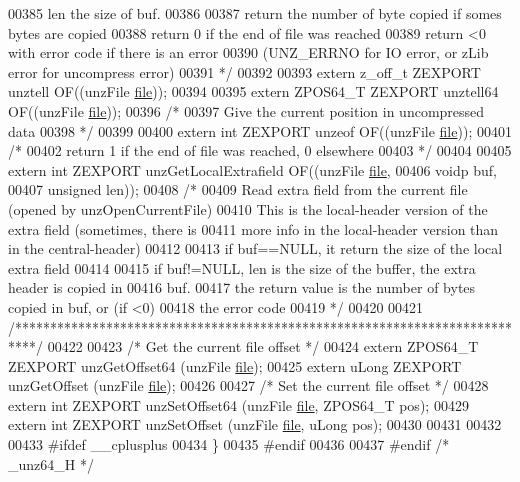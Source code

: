 \begin{DoxyCode}
00385 \textcolor{comment}{  len the size of buf.}
00386 \textcolor{comment}{}
00387 \textcolor{comment}{  return the number of byte copied if somes bytes are copied}
00388 \textcolor{comment}{  return 0 if the end of file was reached}
00389 \textcolor{comment}{  return <0 with error code if there is an error}
00390 \textcolor{comment}{    (UNZ\_ERRNO for IO error, or zLib error for uncompress error)}
00391 \textcolor{comment}{*/}
00392 
00393 \textcolor{keyword}{extern} z\_off\_t ZEXPORT unztell OF((unzFile \hyperlink{structfile}{file}));
00394 
00395 \textcolor{keyword}{extern} ZPOS64\_T ZEXPORT unztell64 OF((unzFile \hyperlink{structfile}{file}));
00396 \textcolor{comment}{/*}
00397 \textcolor{comment}{  Give the current position in uncompressed data}
00398 \textcolor{comment}{*/}
00399 
00400 \textcolor{keyword}{extern} \textcolor{keywordtype}{int} ZEXPORT unzeof OF((unzFile \hyperlink{structfile}{file}));
00401 \textcolor{comment}{/*}
00402 \textcolor{comment}{  return 1 if the end of file was reached, 0 elsewhere}
00403 \textcolor{comment}{*/}
00404 
00405 \textcolor{keyword}{extern} \textcolor{keywordtype}{int} ZEXPORT unzGetLocalExtrafield OF((unzFile \hyperlink{structfile}{file},
00406                                              voidp buf,
00407                                              \textcolor{keywordtype}{unsigned} len));
00408 \textcolor{comment}{/*}
00409 \textcolor{comment}{  Read extra field from the current file (opened by unzOpenCurrentFile)}
00410 \textcolor{comment}{  This is the local-header version of the extra field (sometimes, there is}
00411 \textcolor{comment}{    more info in the local-header version than in the central-header)}
00412 \textcolor{comment}{}
00413 \textcolor{comment}{  if buf==NULL, it return the size of the local extra field}
00414 \textcolor{comment}{}
00415 \textcolor{comment}{  if buf!=NULL, len is the size of the buffer, the extra header is copied in}
00416 \textcolor{comment}{    buf.}
00417 \textcolor{comment}{  the return value is the number of bytes copied in buf, or (if <0)}
00418 \textcolor{comment}{    the error code}
00419 \textcolor{comment}{*/}
00420 
00421 \textcolor{comment}{/***************************************************************************/}
00422 
00423 \textcolor{comment}{/* Get the current file offset */}
00424 \textcolor{keyword}{extern} ZPOS64\_T ZEXPORT unzGetOffset64 (unzFile \hyperlink{structfile}{file});
00425 \textcolor{keyword}{extern} uLong ZEXPORT unzGetOffset (unzFile \hyperlink{structfile}{file});
00426 
00427 \textcolor{comment}{/* Set the current file offset */}
00428 \textcolor{keyword}{extern} \textcolor{keywordtype}{int} ZEXPORT unzSetOffset64 (unzFile \hyperlink{structfile}{file}, ZPOS64\_T pos);
00429 \textcolor{keyword}{extern} \textcolor{keywordtype}{int} ZEXPORT unzSetOffset (unzFile \hyperlink{structfile}{file}, uLong pos);
00430 
00431 
00432 
00433 \textcolor{preprocessor}{#ifdef \_\_cplusplus}
00434 \}
00435 \textcolor{preprocessor}{#endif}
00436 
00437 \textcolor{preprocessor}{#endif }\textcolor{comment}{/* \_unz64\_H */}\textcolor{preprocessor}{}
\end{DoxyCode}
